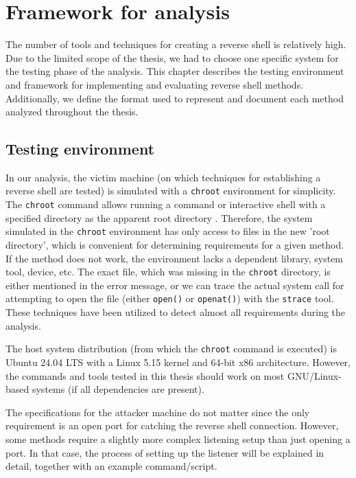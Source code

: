 \chapter{Framework for analysis}
\label{chap:framework}

The number of tools and techniques for creating a reverse shell is relatively high. Due to the limited scope of the thesis, we had to choose one specific system for the testing phase of the analysis. This chapter describes the testing environment and framework for implementing and evaluating reverse shell methods. Additionally, we define the format used to represent and document each method analyzed throughout the thesis.

\section{Testing environment}

In our analysis, the victim machine (on which techniques for establishing a reverse shell are tested) is simulated with a \texttt{chroot} environment for simplicity. The \texttt{chroot} command allows running a command or interactive shell with a specified directory as the apparent root directory \cite{chroot-man}. Therefore, the system simulated in the \texttt{chroot} environment has only access to files in the new 'root directory', which is convenient for determining requirements for a given method. If the method does not work, the environment lacks a dependent library, system tool, device, etc. The exact file, which was missing in the \texttt{chroot} directory, is either mentioned in the error message, or we can trace the actual system call for attempting to open the file (either \texttt{open()} or \texttt{openat()}) with the  \texttt{strace} tool. These techniques have been utilized to detect almost all requirements during the analysis.

The host system distribution (from which the \texttt{chroot} command is executed) is Ubuntu 24.04 LTS with a Linux 5.15 kernel and 64-bit x86 architecture. However, the commands and tools tested in this thesis should work on most GNU/Linux-based systems (if all dependencies are present).

The specifications for the attacker machine do not matter since the only requirement is an open port for catching the reverse shell connection. However, some methods require a slightly more complex listening setup than just opening a port. In that case, the process of setting up the listener will be explained in detail, together with an example command/script.


